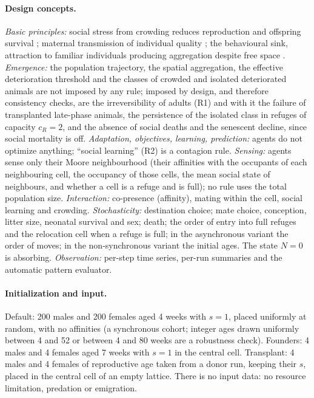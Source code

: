 \documentclass[pre,onecolumn,superscriptaddress,notitlepage]{revtex4-2}
\begin{document}
\paragraph{Design concepts.}
\emph{Basic principles:} social stress from crowding reduces reproduction and offspring survival
\cite{Christian1950,Southwick1955}; maternal transmission of individual quality
\cite{GinzburgTaneyhill1994,InchaustiGinzburg1998}; the behavioural sink, attraction to familiar individuals
producing aggregation despite free space \cite{Calhoun1962,Calhoun1973}. \emph{Emergence:} the population
trajectory, the spatial aggregation, the effective deterioration threshold and the classes of crowded and isolated
deteriorated animals are not imposed by any rule; imposed by design, and therefore consistency checks, are the
irreversibility of adults (R1) and with it the failure of transplanted late-phase animals, the persistence of the
isolated class in refuges of capacity $c_R=2$, and the absence of social deaths and the senescent decline, since
social mortality is off. \emph{Adaptation, objectives, learning, prediction:} agents do not optimize anything;
``social learning'' (R2) is a contagion rule. \emph{Sensing:} agents sense only their Moore neighbourhood (their
affinities with the occupants of each neighbouring cell, the occupancy of those cells, the mean social state of
neighbours, and whether a cell is a refuge and is full); no rule uses the total population size.
\emph{Interaction:} co-presence (affinity), mating within the cell, social learning and crowding.
\emph{Stochasticity:} destination choice; mate choice, conception, litter size, neonatal survival and sex; death;
the order of entry into full refuges and the relocation cell when a refuge is full; in the asynchronous variant the
order of moves; in the non-synchronous variant the initial ages. The state $N=0$ is absorbing.
\emph{Observation:} per-step time series, per-run summaries and the automatic pattern evaluator.

\paragraph{Initialization and input.}
Default: 200 males and 200 females aged 4 weeks with $s=1$, placed uniformly at random, with no affinities (a
synchronous cohort; integer ages drawn uniformly between 4 and 52 or between 4 and 80 weeks are a robustness
check). Founders: 4 males and 4 females aged 7 weeks with $s=1$ in the central cell. Transplant: 4 males and 4
females of reproductive age taken from a donor run, keeping their $s$, placed in the central cell of an empty
lattice. There is no input data: no resource limitation, predation or emigration.
\end{document}
